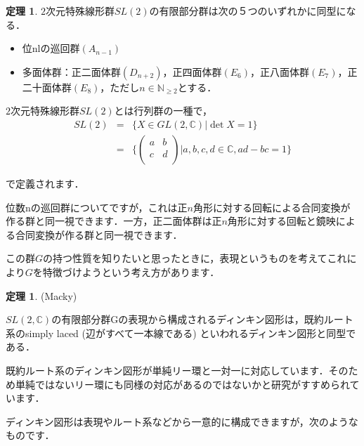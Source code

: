 \documentclass{jreport}
\theoremstyle{definition} %
\newtheorem{ithm}[idefi]{定理}
\begin{document}
\begin{ithm}
  $2$次元特殊線形群$SL(2)$の有限部分群は次の５つのいずれかに同型になる．
  \begin{itemize}
  \item 位nlの巡回群$(A_{n-1})$
  \item 多面体群：正二面体群$(D_{n+2})$，正四面体群$(E_6)$，正八面体群$(E_7)$，正二十面体群$(E_8)$，ただし$n \in\mathbb{N}_{ \geq 2}$とする．
  \end{itemize}
\end{ithm}
$2$次元特殊線形群$SL(2)$とは行列群の一種で，
\begin{eqnarray*}
  SL(2)&=&\{X\in GL(2,\mathbb{C}) | \det X=1\}\\
       &=&\{
           \begin{pmatrix} 
             a&b\\ 
             c&d\\ 
           \end{pmatrix}
  | a,b,c,d \in \mathbb{C} ,ad-bc=1\}
\end{eqnarray*}

で定義されます．

位数nの巡回群についてですが，これは正$n$角形に対する回転による合同変換が作る群と同一視できます．一方，正二面体群は正$n$角形に対する回転と鏡映による合同変換が作る群と同一視できます．

この群$G$の持つ性質を知りたいと思ったときに，表現というものを考えてこれにより$G$を特徴づけようという考え方があります．

\begin{ithm}(Macky)
  
  $SL(2,\mathbb{C})$の有限部分群Gの表現から構成されるディンキン図形は，既約ルート系のsimply laced (辺がすべて一本線である) といわれるディンキン図形と同型である．
\end{ithm}

既約ルート系のディンキン図形が単純リー環と一対一に対応しています．そのため単純ではないリー環にも同様の対応があるのではないかと研究がすすめられています．

ディンキン図形は表現やルート系などから一意的に構成できますが，次のようなものです．
\end{document}
